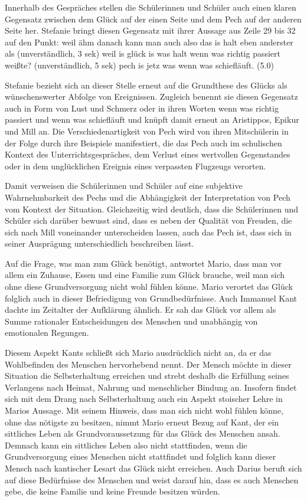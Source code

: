 Innerhalb des Gespräches stellen die Schülerinnen und Schüler auch einen klaren Gegensatz zwischen dem Glück auf der einen Seite und dem Pech auf der anderen Seite her. 
Stefanie bringt diesen Gegensatz mit ihrer Aussage aus Zeile 29 bis 32 auf den Punkt:
\glqq weil ähm danach kann man auch also das is halt eben anderster als (unverständlich, 3 sek) weil is glück is was halt wenn was richtig passiert weißte? (unverständlich, 5 sek) pech is jetz was wenn was schiefläuft. (5.0)\grqq{}

Stefanie bezieht sich an dieser Stelle erneut auf die Grundthese des Glücks als wünschenswerter Abfolge von Ereignissen. 
Zugleich benennt sie diesen Gegensatz auch in Form von Lust und Schmerz oder in ihren Worten \glqq wenn was richtig passiert\grqq{} und \glqq wenn was schiefläuft\grqq{} und knüpft damit erneut an Aristippos, Epikur und Mill an. 
Die Verschiedenartigkeit von Pech wird von ihren Mitschülerin in der Folge durch ihre Beispiele manifestiert, die das Pech auch im schulischen Kontext des Unterrichtsgespräches, dem Verlust eines wertvollen Gegenstandes oder in dem unglücklichen Ereignis eines verpassten Flugzeugs verorten. 

Damit verweisen die Schülerinnen und Schüler auf eine subjektive Wahrnehmbarkeit des Pechs und die Abhängigkeit der Interpretation von Pech vom Kontext der Situation. 
Gleichzeitig wird deutlich, dass die Schülerinnen und Schüler sich darüber bewusst sind, dass es neben der Qualität von Freuden, die sich nach Mill voneinander unterscheiden lassen, auch das Pech ist, dass sich in seiner Ausprägung unterschiedlich beschreiben lässt.

Auf die Frage, was man zum Glück benötigt, antwortet Mario, dass man vor allem ein Zuhause, Essen und eine Familie zum Glück brauche, weil man sich ohne diese Grundversorgung nicht wohl fühlen könne.
 Mario verortet das Glück folglich auch in dieser Befriedigung von Grundbedürfnisse. 
 Auch Immanuel Kant dachte im Zeitalter der Aufklärung ähnlich. 
 Er sah das Glück vor allem als Summe rationaler Entscheidungen des Menschen und unabhängig von emotionalen Regungen. 
 
Diesem Aspekt Kants schließt sich Mario ausdrücklich nicht an, da er das Wohlbefinden des Menschen hervorhebend nennt. 
Der Mensch möchte in dieser Situation die Selbsterhaltung erreichen und strebt deshalb die Erfüllung seines Verlangens nach Heimat, Nahrung und menschlicher Bindung an. 
Insofern findet sich mit dem Drang nach Selbsterhaltung auch ein Aspekt stoischer Lehre in Marios Aussage. 
Mit seinem Hinweis, dass man sich nicht wohl fühlen könne, ohne das nötigste zu besitzen, nimmt Mario erneut Bezug auf Kant, der ein sittliches Leben als Grundvoraussetzung für das Glück des Menschen ansah. 
Demnach kann ein sittliches Leben also nicht stattfinden, wenn die Grundversorgung eines Menschen nicht stattfindet und folglich kann dieser Mensch nach kantischer Lesart das Glück nicht erreichen. 
Auch Darius beruft sich auf diese Bedürfnisse des Menschen und weist darauf hin, dass es auch Menschen gebe, die keine Familie und keine Freunde besitzen würden. 

